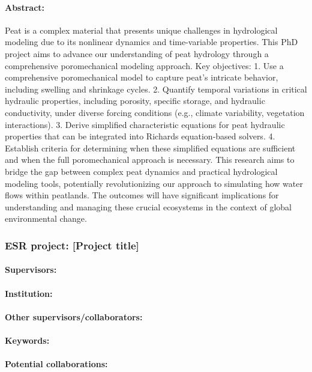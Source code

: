 \documentclass[12pt]{article}
\begin{document}
\paragraph{Abstract:} Peat is a complex material that presents unique challenges in hydrological modeling due to its nonlinear dynamics and time-variable properties. This PhD project aims to advance our understanding of peat hydrology through a comprehensive poromechanical modeling approach.
Key objectives:
1.	Use a comprehensive poromechanical model to capture peat's intricate behavior, including swelling and shrinkage cycles.
2.	Quantify temporal variations in critical hydraulic properties, including porosity, specific storage, and hydraulic conductivity, under diverse forcing conditions (e.g., climate variability, vegetation interactions).
3.	Derive simplified characteristic equations for peat hydraulic properties that can be integrated into Richards equation-based solvers.
4.	Establish criteria for determining when these simplified equations are sufficient and when the full poromechanical approach is necessary.
This research aims to bridge the gap between complex peat dynamics and practical hydrological modeling tools, potentially revolutionizing our approach to simulating how water flows within peatlands. The outcomes will have significant implications for understanding and managing these crucial ecosystems in the context of global environmental change.

\subsubsection*{ESR project: [Project title]}
\paragraph{Supervisors:} 
\paragraph{Institution:} 
\paragraph{Other supervisors/collaborators:} 
\paragraph{Keywords:} 
\paragraph{Potential collaborations:} 
\end{document}
